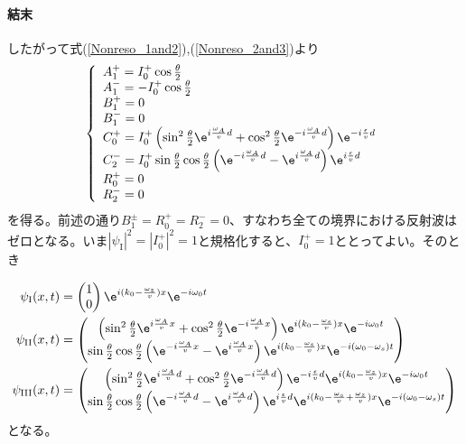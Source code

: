 \paragraph{結末}
したがって式(\ref{Nonreso_1and2}),(\ref{Nonreso_2and3})より
\begin{equation}
\left\{ \begin{array}{l}
A_1^+=I_0^+ \cos \frac{\theta}{2} \\
A_1^-=-I_0^+ \cos \frac{\theta}{2} \\
B_1^+=0 \\
B_1^-=0 \\
C_0^+=I_0^+\left(\sin^2 \frac{\theta}{2} \e^{i\frac{\omega_A}{v}d} +\cos^2 \frac{\theta}{2} \e^{-i\frac{\omega_A}{v}d} \right)  \e^{-i\frac{\epsilon}{v}d} \\
C_2^-=I_0^+ \sin\frac{\theta}{2}\cos\frac{\theta}{2} \left(\e^{-i\frac{\omega_A}{v}d}-\e^{i\frac{\omega_A}{v}d}\right) \e^{i\frac{\epsilon}{v}d}\\
R_0^+=0\\
R_2^-=0
\end{array} \right.
\end{equation}
を得る。前述の通り$B_1^\pm=R_0^+=R_2^-=0$、すなわち全ての境界における反射波はゼロとなる。いま$|\psi_\mathrm{I}|^2=|I_0^+|^2=1$と規格化すると、$I_0^+=1$ととってよい。そのとき

\begin{align}
\psi_\mathrm{I}(x,t)&=\begin{pmatrix} 1\\0\end{pmatrix} \e^{i (k_0-\frac{\omega_z}{v})x}\e^{-i\omega_0t}\\
\psi_\mathrm{II}(x,t)&=\begin{pmatrix} \left(\sin^2 \frac{\theta}{2} \e^{i\frac{\omega_A}{v}x} +\cos^2 \frac{\theta}{2} \e^{-i\frac{\omega_A}{v}x} \right) \e^{i(k_0-\frac{\omega_s}{v}) x} \e^{-i\omega_0 t} \\ \sin\frac{\theta}{2}\cos\frac{\theta}{2} \left(\e^{-i\frac{\omega_A}{v}x}-\e^{i\frac{\omega_A}{v}x}\right) \e^{i(k_0-\frac{\omega_s}{v}) x} \e^{-i(\omega_0-\omega_s) t}\end{pmatrix}\\
\psi_\mathrm{III}(x,t)&=\begin{pmatrix} \left(\sin^2 \frac{\theta}{2} \e^{i\frac{\omega_A}{v}d} +\cos^2 \frac{\theta}{2} \e^{-i\frac{\omega_A}{v}d} \right)\e^{-i\frac{\epsilon}{v}d} \e^{i(k_0-\frac{\omega_z}{v})x}\e^{-i\omega_0t} \\ \sin\frac{\theta}{2}\cos\frac{\theta}{2} \left(\e^{-i\frac{\omega_A}{v}d}-\e^{i\frac{\omega_A}{v}d}\right)  \e^{i\frac{\epsilon}{v}d} \e^{i(k_0-\frac{\omega_s}{v}+\frac{\omega_z}{v})x}\e^{-i(\omega_0-\omega_s)t} \end{pmatrix}
\end{align}
となる。

